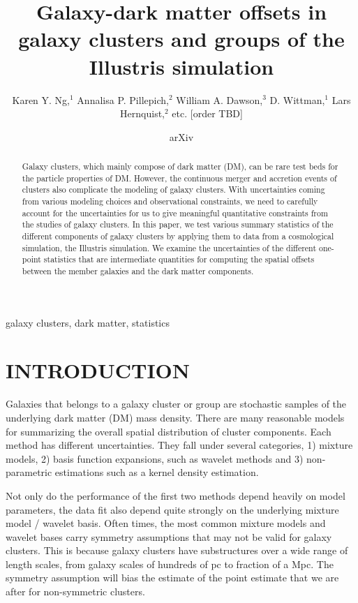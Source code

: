 \documentclass[usenatbib]{mn2e}
\title[
	Galaxy-dark matter offsets in galaxy clusters and groups of the
Illustris simulation
]
{Galaxy-dark matter offsets in galaxy clusters and groups of the
Illustris simulation}
\author[Karen Y. Ng et al.]{Karen Y. Ng,$^{1}$
	Annalisa P. Pillepich,$^{2}$ 
	William A. Dawson,$^{3}$ 
	D. Wittman,$^{1}$
	\newauthor Lars Hernquist,$^{2}$
	etc. [order TBD]
}
\begin{document}
\date{arXiv} \pagerange{\pageref{firstpage}--\pageref{lastpage}}
 \maketitle\label{firstpage}
\begin{abstract} 
	Galaxy clusters, which mainly compose of dark matter (DM), 
	can be rare test beds for the particle properties of DM.
	However, the continuous merger and accretion events of clusters also
	complicate the modeling of galaxy clusters.
	With uncertainties coming from various modeling choices and observational constraints, 
	we need to carefully account for the
	uncertainties for us to give meaningful quantitative constraints from 
	the studies of galaxy clusters. In this paper, 
	we test various summary statistics of the different components
	of galaxy clusters by applying them to data from a cosmological simulation,
	the Illustris simulation. 
	We examine the uncertainties of the different one-point statistics that
	are intermediate quantities for computing the spatial offsets between
	the member galaxies and the dark matter components. 
\end{abstract}

\begin{keywords}
	galaxy clusters, dark matter, statistics 
\end{keywords}

\section{INTRODUCTION} 
Galaxies that belongs to a galaxy cluster or group are stochastic samples
of the underlying dark matter (DM) mass density. 
There are many reasonable models for summarizing the overall spatial
distribution of cluster components. Each method has different uncertainties.
They fall under several categories, 1) mixture models, 2) basis function
expansions, such as wavelet methods 
 and 3) non-parametric estimations such as a kernel density estimation. 

Not only do the performance of the first two methods depend heavily on model parameters, 
the data fit also depend quite strongly on the underlying mixture model /
wavelet basis. Often times, the most common mixture models and wavelet bases 
carry symmetry assumptions that may not be valid for galaxy clusters. 
This is because galaxy clusters have substructures over a wide range of length
scales, from galaxy scales of hundreds of pc to fraction of a Mpc. 
The symmetry assumption will bias the estimate of the point estimate that we
are after for non-symmetric clusters.
\end{document}

